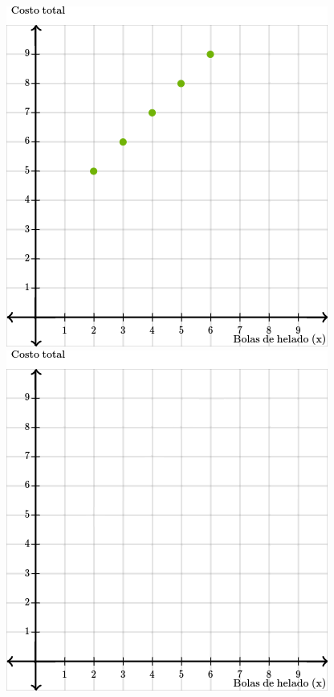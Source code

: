 \begin{multicols}{2}
\begin{parts}
        \columnbreak

        \begin{figure}[H]
            \centering
            \ifprintanswers
                \includegraphics[width=0.7\linewidth]{../images/20230321002620}
            \else
                \includegraphics[width=0.7\linewidth]{../images/20230321002620_blank}
            \fi
            \caption{}%
            \label{fig:20230321002620}
        \end{figure}
    \end{parts}
\end{multicols}
